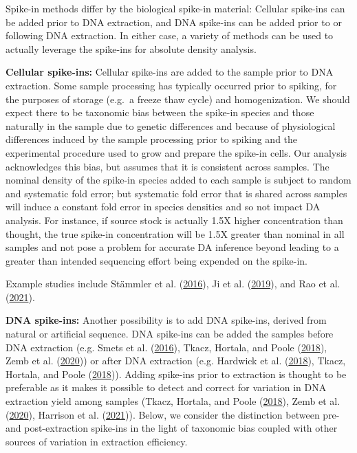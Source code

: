 \documentclass[
]{article}
\begin{document}
Spike-in methods differ by the biological spike-in material:
Cellular spike-ins can be added prior to DNA extraction, and DNA spike-ins can be added prior to or following DNA extraction.
In either case, a variety of methods can be used to actually leverage the spike-ins for absolute density analysis.

\textbf{Cellular spike-ins:}
Cellular spike-ins are added to the sample prior to DNA extraction.
Some sample processing has typically occurred prior to spiking, for the purposes of storage (e.g.~a freeze thaw cycle) and homogenization.
We should expect there to be taxonomic bias between the spike-in species and those naturally in the sample due to genetic differences and because of physiological differences induced by the sample processing prior to spiking and the experimental procedure used to grow and prepare the spike-in cells.
Our analysis acknowledges this bias, but assumes that it is consistent across samples.
The nominal density of the spike-in species added to each sample is subject to random and systematic fold error; but systematic fold error that is shared across samples will induce a constant fold error in species densities and so not impact DA analysis.
For instance, if source stock is actually 1.5X higher concentration than thought, the true spike-in concentration will be 1.5X greater than nominal in all samples and not pose a problem for accurate DA inference beyond leading to a greater than intended sequencing effort being expended on the spike-in.

Example studies include Stämmler et al. (\protect\hyperlink{ref-stammler2016adju}{2016}), Ji et al. (\protect\hyperlink{ref-ji2019quan}{2019}), and Rao et al. (\protect\hyperlink{ref-rao2021mult}{2021}).

\textbf{DNA spike-ins:}
Another possibility is to add DNA spike-ins, derived from natural or artificial sequence.
DNA spike-ins can be added the samples before DNA extraction (e.g. Smets et al. (\protect\hyperlink{ref-smets2016amet}{2016}), Tkacz, Hortala, and Poole (\protect\hyperlink{ref-tkacz2018abso}{2018}), Zemb et al. (\protect\hyperlink{ref-zemb2020abso}{2020})) or after DNA extraction (e.g. Hardwick et al. (\protect\hyperlink{ref-hardwick2018synt}{2018}), Tkacz, Hortala, and Poole (\protect\hyperlink{ref-tkacz2018abso}{2018})).
Adding spike-ins prior to extraction is thought to be preferable as it makes it possible to detect and correct for variation in DNA extraction yield among samples
(Tkacz, Hortala, and Poole (\protect\hyperlink{ref-tkacz2018abso}{2018}), Zemb et al. (\protect\hyperlink{ref-zemb2020abso}{2020}), Harrison et al. (\protect\hyperlink{ref-harrison2021theq}{2021})).
Below, we consider the distinction between pre- and post-extraction spike-ins in the light of taxonomic bias coupled with other sources of variation in extraction efficiency.
\end{document}
